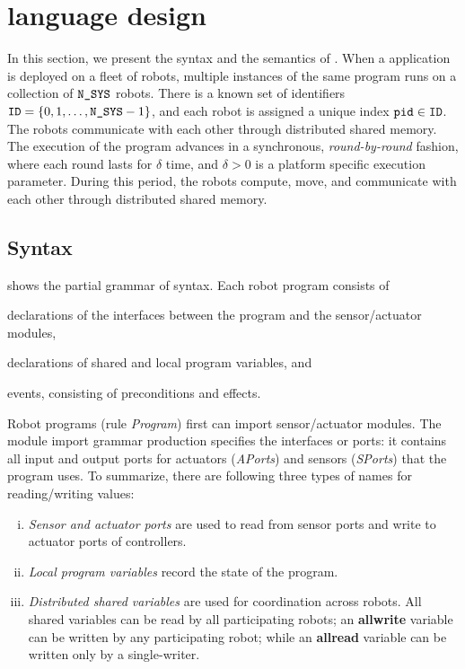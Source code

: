 \section{\lgname language design}
\label{sec:language}

In this section, we present the syntax and the semantics of \lgname.
%
%
When a \lgname application is deployed on a fleet of robots, multiple instances of the same program runs on a collection of $\texttt{N\_SYS}$ robots.
There is a known set of identifiers $\texttt{ID}=\{0,1,\dots,\texttt{N\_SYS}-1\}$, and each robot is assigned  a unique index $\texttt{pid} \in \texttt{ID}$.
%
The robots communicate with each other through distributed shared memory. 
The execution of the \lgname program advances in a synchronous, \emph{round-by-round} fashion, where each round lasts for $\delta$ time,
and $\delta >0$ is a platform specific execution parameter.
During this period, the robots compute, move, and 
communicate with each other through distributed shared memory. 



\subsection{Syntax}\label{sec:syntax}

 shows the partial grammar of \lgname syntax.
Each robot program consists of
\begin{inparaenum}[(a)]
\item declarations of the interfaces between the program and the sensor/actuator modules,
\item declarations of shared and local program variables, and
\item events, consisting of preconditions and effects.
\end{inparaenum}
Robot programs (rule \emph{Program}) first can import sensor/actuator modules.
The module import grammar production specifies the interfaces or ports:
it contains all input and output ports for actuators (\emph{APorts}) and sensors (\emph{SPorts}) that the program uses.
To summarize, there are following three types of names for reading/writing values:
\begin{enumerate}[(i)]
\item \emph{Sensor and actuator ports} are used to read from sensor ports and write to actuator ports of controllers.
\item \emph{Local program variables} record the state of the program.
\item \emph{Distributed shared variables} are used for coordination across robots. All shared variables can be read by all participating robots; an
      \textbf{allwrite} variable can be written by any participating robot; while an 
      \textbf{allread} variable can be written only by a single-writer.
\end{enumerate}

